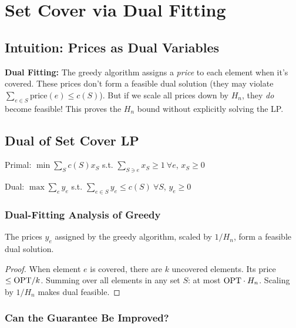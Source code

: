 \setcounter{chapter}{12}
\chapter{Set Cover via Dual Fitting}
\label{ch:setcover_dual}

\section{Intuition: Prices as Dual Variables}

\begin{intuitionbox}
\textbf{Dual Fitting:} The greedy algorithm assigns a \emph{price} to each element when it's covered. These prices don't form a feasible dual solution (they may violate $\sum_{e \in S} \text{price}(e) \leq c(S)$). But if we scale all prices down by $H_n$, they \emph{do} become feasible! This proves the $H_n$ bound without explicitly solving the LP.
\end{intuitionbox}

\section{Dual of Set Cover LP}

Primal: $\min \sum_S c(S) x_S$ s.t. $\sum_{S \ni e} x_S \geq 1 \ \forall e$, $x_S \geq 0$

Dual: $\max \sum_e y_e$ s.t. $\sum_{e \in S} y_e \leq c(S) \ \forall S$, $y_e \geq 0$

\subsection{Dual-Fitting Analysis of Greedy}

\begin{theorem}
The prices $y_e$ assigned by the greedy algorithm, scaled by $1/H_n$, form a feasible dual solution.
\end{theorem}
\begin{proof}
When element $e$ is covered, there are $k$ uncovered elements. Its price $\leq \mathrm{OPT}/k$. Summing over all elements in any set $S$: at most $\mathrm{OPT} \cdot H_n$. Scaling by $1/H_n$ makes dual feasible.
\end{proof}

\subsection{Can the Guarantee Be Improved?}

